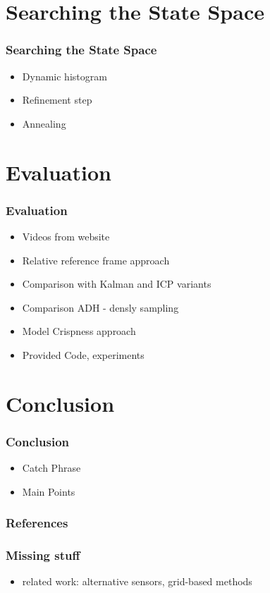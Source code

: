 \section{Searching the State Space}
\begin{frame}
  \frametitle{Searching the State Space}
  \begin{itemize}
  \item Dynamic histogram
  \item Refinement step
  \item Annealing
  \end{itemize}
\end{frame}

\section{Evaluation}
\begin{frame}
  \frametitle{Evaluation}
  \begin{itemize}
  \item Videos from website
  \item Relative reference frame approach
  \item Comparison with Kalman and ICP variants
  \item Comparison ADH - densly sampling
  \item Model Crispness approach
  \item Provided Code, experiments
  \end{itemize}
\end{frame}

\section{Conclusion}
\begin{frame}
  \frametitle{Conclusion}
  \begin{itemize}
  \item Catch Phrase
  \item Main Points
  \end{itemize}
\end{frame}



\backupbegin

\begin{frame}[allowframebreaks]
  \frametitle{References}
  
  
\end{frame}

\begin{frame}
  \frametitle{Missing stuff}
  \begin{itemize}
  \item related work: alternative sensors, grid-based methods
  \end{itemize}
\end{frame}

\backupend


